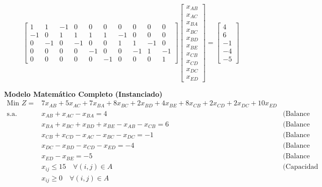 \documentclass{article}
\begin{document}
	$$ 
	\begin{bmatrix}
		1 & 1 & -1 & 0 & 0 & 0 & 0 & 0 & 0 & 0 \\
		-1 & 0 & 1 & 1 & 1 & 1 & -1 & 0 & 0 & 0 \\
		0 & -1 & 0 & -1 & 0 & 0 & 1 & 1 & -1 & 0 \\
		0 & 0 & 0 & 0 & -1 & 0 & 0 & -1 & 1 & -1 \\
		0 & 0 & 0 & 0 & 0 & -1 & 0 & 0 & 0 & 1
	\end{bmatrix} 
	\begin{bmatrix} 
		x_{AB} \\ x_{AC} \\ x_{BA} \\ x_{BC} \\ x_{BD} \\ x_{BE} \\ x_{CB} \\ x_{CD} \\ x_{DC} \\ x_{ED} 
	\end{bmatrix} 
	= 
	\begin{bmatrix} 
		4 \\ 6 \\ -1 \\ -4 \\ -5 
	\end{bmatrix} 
	$$
	
	\vspace{0.5cm}
	\begin{center}
		\textbf{Modelo Matemático Completo (Instanciado)}
		$$\begin{aligned}
			\text{Min } Z = & 7x_{AB} + 5x_{AC} + 7x_{BA} + 8x_{BC} + 2x_{BD} + 4x_{BE} + 8x_{CB} + 2x_{CD} + 2x_{DC} + 10x_{ED} \\
			\text{s.a.} \quad & x_{AB} + x_{AC} - x_{BA} = 4 & \text{(Balance A)} \\
			& x_{BA} + x_{BC} + x_{BD} + x_{BE} - x_{AB} - x_{CB} = 6 & \text{(Balance B)} \\
			& x_{CB} + x_{CD} - x_{AC} - x_{BC} - x_{DC} = -1 & \text{(Balance C)} \\
			& x_{DC} - x_{BD} - x_{CD} - x_{ED} = -4 & \text{(Balance D)} \\
			& x_{ED} - x_{BE} = -5 & \text{(Balance E)} \\
			& x_{ij} \leq 15 \quad \forall (i,j) \in A & \text{(Capacidad Cañerías)} \\
			& x_{ij} \geq 0 \quad \forall (i,j) \in A & 
		\end{aligned}$$
	\end{center}
	
	
\end{document}
